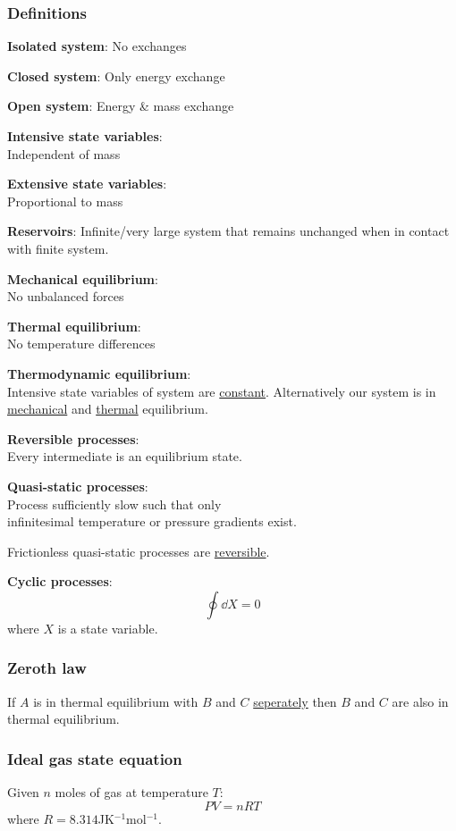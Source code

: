\documentclass{article}
\begin{document}
\begin{multicols*}{3}
\noindent

\subsubsection*{Definitions}

\textbf{Isolated system}: No exchanges

\textbf{Closed system}: Only energy exchange

\textbf{Open system}: Energy \& mass exchange

\textbf{Intensive state variables}: \\
Independent of mass

\textbf{Extensive state variables}: \\
Proportional to mass

\textbf{Reservoirs}: Infinite/very large system
that remains unchanged when in contact
with finite system.

\textbf{Mechanical equilibrium}: \\
No unbalanced forces

\textbf{Thermal equilibrium}: \\
No temperature differences

\textbf{Thermodynamic equilibrium}: \\
Intensive state variables of system are \underline{constant}.
Alternatively our system is in \underline{mechanical} and
\underline{thermal} equilibrium.

\textbf{Reversible processes}: \\
Every intermediate is an equilibrium state.

\textbf{Quasi-static processes}: \\
Process sufficiently slow such that only \\
infinitesimal temperature or pressure gradients exist.

Frictionless quasi-static processes are \underline{reversible}.

\textbf{Cyclic processes}:
$$\oint\dd X=0$$
where $X$ is a state variable.

\subsubsection*{Zeroth law}
If $A$ is in thermal equilibrium with $B$ and $C$
\underline{seperately} then $B$ and $C$
are also in thermal equilibrium.

\subsubsection*{Ideal gas state equation}
Given $n$ moles of gas at temperature $T$:
$$PV=nRT$$
where $R=8.314$JK$^{-1}$mol$^{-1}$.


\end{multicols*}
\end{document}
